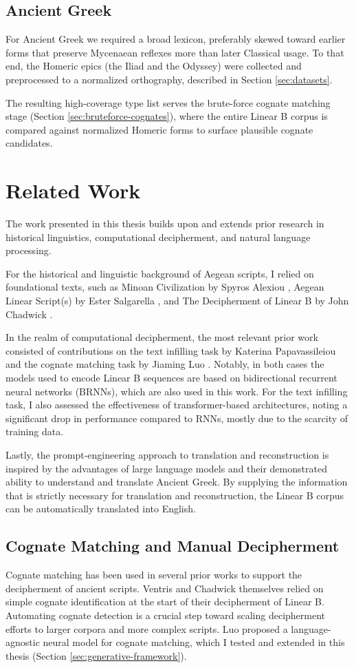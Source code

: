 \subsection{Ancient Greek}
For Ancient Greek we required a broad lexicon, preferably skewed toward earlier forms that preserve Mycenaean reflexes more than later Classical usage.
To that end, the Homeric epics (the Iliad and the Odyssey) were collected and preprocessed to a normalized orthography, described in Section \ref{sec:datasets}.

The resulting high-coverage type list serves the brute-force cognate matching stage (Section \ref{sec:bruteforce-cognates}), where the entire Linear B corpus is compared against normalized Homeric forms to surface plausible cognate candidates.

\section{Related Work}
The work presented in this thesis builds upon and extends prior research in historical linguistics, computational decipherment, and natural language processing.

For the historical and linguistic background of Aegean scripts, I relied on foundational texts, such as Minoan Civilization by Spyros Alexiou \cite{alexiou-ch2}, Aegean Linear Script(s) by Ester Salgarella \cite{salg-ch1}, and The Decipherment of Linear B by John Chadwick \cite{chad-ch2}.

In the realm of computational decipherment, the most relevant prior work consisted of contributions on the text infilling task by Katerina Papavassileiou \cite{brnn-paper} and the cognate matching task by Jiaming Luo \cite{luo}.  
Notably, in both cases the models used to encode Linear B sequences are based on bidirectional recurrent neural networks (BRNNs), which are also used in this work.  
For the text infilling task, I also assessed the effectiveness of transformer-based architectures, noting a significant drop in performance compared to RNNs, mostly due to the scarcity of training data. 

Lastly, the prompt-engineering approach to translation and reconstruction is inspired by the advantages of large language models and their demonstrated ability to understand and translate Ancient Greek.  
By supplying the information that is strictly necessary for translation and reconstruction, the Linear B corpus can be automatically translated into English.

\subsection{Cognate Matching and Manual Decipherment}
Cognate matching has been used in several prior works to support the decipherment of ancient scripts.  
Ventris and Chadwick themselves relied on simple cognate identification at the start of their decipherment of Linear B.  
Automating cognate detection is a crucial step toward scaling decipherment efforts to larger corpora and more complex scripts.  
Luo proposed a language-agnostic neural model for cognate matching, which I tested and extended in this thesis (Section \ref{sec:generative-framework}).


